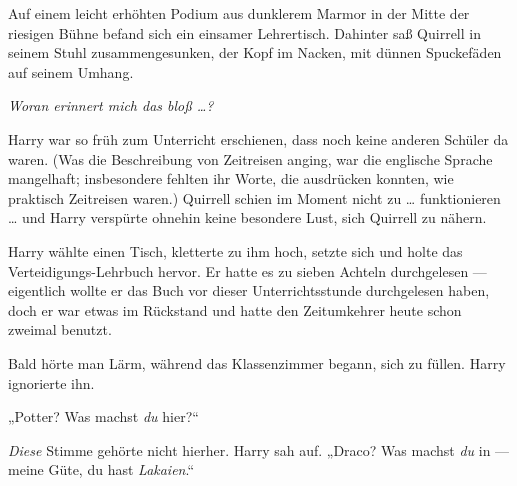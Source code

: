 Auf einem leicht erhöhten Podium aus dunklerem Marmor in der Mitte der riesigen Bühne befand sich ein einsamer Lehrertisch. Dahinter saß Quirrell in seinem Stuhl zusammengesunken, der Kopf im Nacken, mit dünnen Spuckefäden auf seinem Umhang.

\emph{Woran erinnert mich das bloß …?}

Harry war so früh zum Unterricht erschienen, dass noch keine anderen Schüler da waren. (Was die Beschreibung von Zeitreisen anging, war die englische Sprache mangelhaft; insbesondere fehlten ihr Worte, die ausdrücken konnten, wie praktisch Zeitreisen waren.) Quirrell schien im Moment nicht zu … funktionieren … und Harry verspürte ohnehin keine besondere Lust, sich Quirrell zu nähern.

Harry wählte einen Tisch, kletterte zu ihm hoch, setzte sich und holte das Verteidigungs-Lehrbuch hervor. Er hatte es zu sieben Achteln durchgelesen — eigentlich wollte er das Buch vor dieser Unterrichtsstunde durchgelesen haben, doch er war etwas im Rückstand und hatte den Zeitumkehrer heute schon zweimal benutzt.

Bald hörte man Lärm, während das Klassenzimmer begann, sich zu füllen. Harry ignorierte ihn.

„Potter? Was machst \emph{du} hier?“

\emph{Diese} Stimme gehörte nicht hierher. Harry sah auf.
„Draco? Was machst \emph{du} in — meine Güte, du hast \emph{Lakaien}.“

